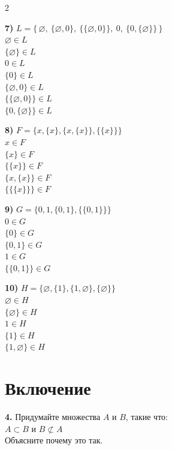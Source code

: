 \documentclass[12pt]{article}
\begin{document}
\begin{multicols}{2}
\bigskip

\textbf{7)} 
$L = \{\, \varnothing,\ \{\varnothing,0\},\ \{\{\varnothing,0\}\},\ 0,\ \{0,\{\varnothing\}\} \,\}$\\
$\varnothing \in L$\\
$\{\varnothing\} \in L$\\
$0 \in L$\\
$\{0\} \in L$\\
$\{\varnothing,0\} \in L$\\
$\{\{\varnothing,0\}\} \in L$\\
$\{0,\{\varnothing\}\} \in L$\\

\bigskip

\textbf{8)} 
$F = \{x, \{x\}, \{x,\{x\}\}, \{\{x\}\}\}$\\
$x \in F$\\
$\{x\} \in F$\\
$\{\{x\}\} \in F$\\
$\{x,\{x\}\} \in F$\\
$\{\{\{x\}\}\} \in F$\\

\bigskip

\textbf{9)} 
$G = \{0, 1, \{0,1\}, \{\{0,1\}\}\}$\\
$0 \in G$\\
$\{0\} \in G$\\
$\{0,1\} \in G$\\
$1 \in G$\\
$\{\{0,1\}\} \in G$\\

\bigskip

\textbf{10)} 
$H = \{\varnothing, \{1\}, \{1,\varnothing\}, \{\varnothing\}\}$\\
$\varnothing \in H$\\
$\{\varnothing\} \in H$\\
$1 \in H$\\
$\{1\} \in H$\\
$\{1,\varnothing\} \in H$\\
\end{multicols}
\section{Включение}
\bigskip
\noindent \textbf{4.}
Придумайте множества $A$ и $B$, такие что:\\
$A \subset B$ и $B \not\subset A$\\
Объясните почему это так.
\end{document}
